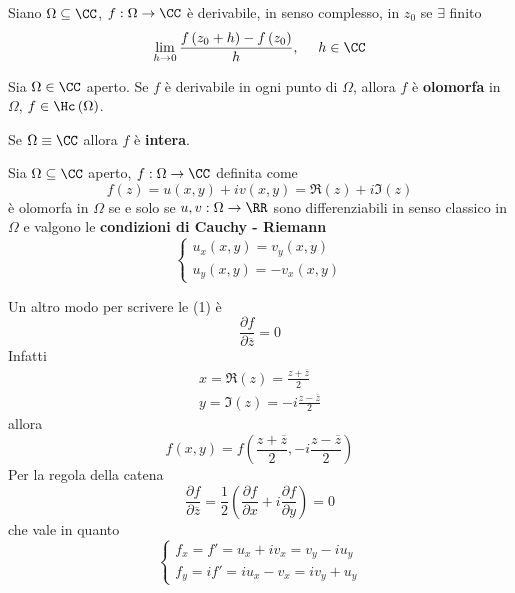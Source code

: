 \begin{defn}
Siano $\Omega \subseteq \CC $, $f:\Omega \rightarrow \CC $ è derivabile, in senso complesso, in $z_{0}$ se $\exists $ finito
\begin{equation*}
\lim\limits_{h\rightarrow 0}\frac{f\left(z_{0} + h\right) - f\left(z_{0}\right)}{h}, \ \ \ \ h\in \CC
\end{equation*}
\end{defn}
\begin{defn}
Sia $\Omega \in \CC $ aperto. Se $f$ è derivabile in ogni punto di $\Omega $, allora $f$ è \textbf{olomorfa} in $\Omega $, $f\in \Hc \left(\Omega \right)$.
\end{defn}
\begin{rem}
Se $\Omega \equiv \CC $ allora $f$ è \textbf{intera}.
\end{rem}
\begin{thm}
 Sia $\Omega \subseteq \CC $ aperto, $f:\Omega \rightarrow \CC $ definita come
\begin{equation*}
f(z) = u\left(x, y\right) + iv\left(x, y\right) = \Re (z) + i\Im (z)
\end{equation*}
è olomorfa in $\Omega $ se e solo se $u, v:\Omega \rightarrow \RR $ sono differenziabili in senso classico in $\Omega $ e valgono le \textbf{condizioni di Cauchy - Riemann}
\begin{equation}
\begin{cases}
u_{x}\left(x, y\right) = v_{y}\left(x, y\right)\\
u_{y}\left(x, y\right) = - v_{x}\left(x, y\right)
\end{cases}
\end{equation}
\end{thm}
\begin{rem}
Un altro modo per scrivere le (1) è
\begin{equation*}
\frac{\partial f}{\partial \overline{z}} = 0
\end{equation*}
Infatti
\begin{equation*}
\begin{array}{l}
x = \Re (z) = \frac{z + \overline{z}}{2}\\
y = \Im (z) = - i\frac{z - \overline{z}}{2}
\end{array}
\end{equation*}
allora
\begin{equation*}
f\left(x, y\right) = f\left(\frac{z + \overline{z}}{2}, - i\frac{z - \overline{z}}{2}\right)
\end{equation*}
Per la regola della catena
\begin{equation*}
\frac{\partial f}{\partial \overline{z}} = \frac{1}{2}\left(\frac{\partial f}{\partial x} + i\frac{\partial f}{\partial y}\right) = 0
\end{equation*}
che vale in quanto
\begin{equation*}
\begin{cases}
f_{x} = f' = u_{x} + iv_{x} = v_{y} - iu_{y}\\
f_{y} = if' = iu_{x} - v_{x} = iv_{y} + u_{y}
\end{cases}
\end{equation*}
\end{rem}
